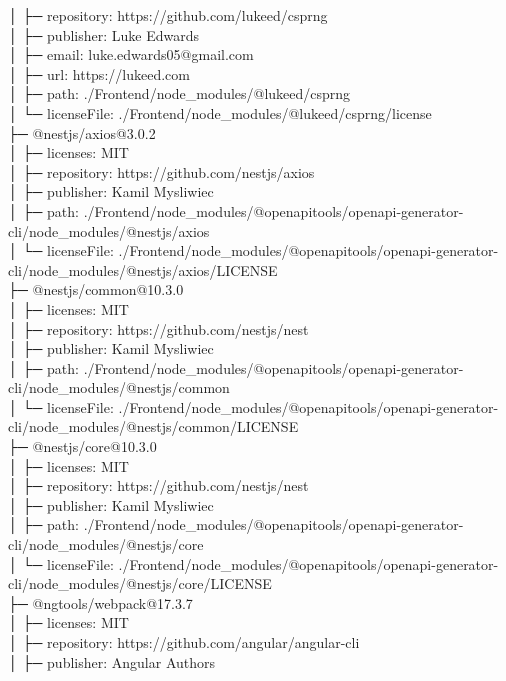 │  ├─ repository: https://github.com/lukeed/csprng\\
│  ├─ publisher: Luke Edwards\\
│  ├─ email: luke.edwards05@gmail.com\\
│  ├─ url: https://lukeed.com\\
│  ├─ path: ./Frontend/node\_modules/@lukeed/csprng\\
│  └─ licenseFile: ./Frontend/node\_modules/@lukeed/csprng/license\\
├─ @nestjs/axios@3.0.2\\
│  ├─ licenses: MIT\\
│  ├─ repository: https://github.com/nestjs/axios\\
│  ├─ publisher: Kamil Mysliwiec\\
│  ├─ path: ./Frontend/node\_modules/@openapitools/openapi-generator-cli/node\_modules/@nestjs/axios\\
│  └─ licenseFile: ./Frontend/node\_modules/@openapitools/openapi-generator-cli/node\_modules/@nestjs/axios/LICENSE\\
├─ @nestjs/common@10.3.0\\
│  ├─ licenses: MIT\\
│  ├─ repository: https://github.com/nestjs/nest\\
│  ├─ publisher: Kamil Mysliwiec\\
│  ├─ path: ./Frontend/node\_modules/@openapitools/openapi-generator-cli/node\_modules/@nestjs/common\\
│  └─ licenseFile: ./Frontend/node\_modules/@openapitools/openapi-generator-cli/node\_modules/@nestjs/common/LICENSE\\
├─ @nestjs/core@10.3.0\\
│  ├─ licenses: MIT\\
│  ├─ repository: https://github.com/nestjs/nest\\
│  ├─ publisher: Kamil Mysliwiec\\
│  ├─ path: ./Frontend/node\_modules/@openapitools/openapi-generator-cli/node\_modules/@nestjs/core\\
│  └─ licenseFile: ./Frontend/node\_modules/@openapitools/openapi-generator-cli/node\_modules/@nestjs/core/LICENSE\\
├─ @ngtools/webpack@17.3.7\\
│  ├─ licenses: MIT\\
│  ├─ repository: https://github.com/angular/angular-cli\\
│  ├─ publisher: Angular Authors\\
